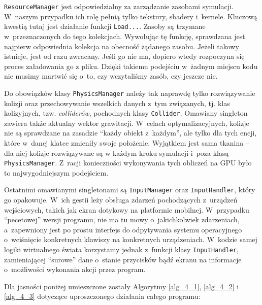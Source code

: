 	\texttt{ResourceManager} jest odpowiedzialny za zarządzanie zasobami symulacji. W~naszym przypadku ich rolę pełnią tylko tekstury, shadery i~kernele. Kluczową kwestią tutaj jest działanie funkcji \texttt{Load...}. Zasoby są trzymane w~przeznaczonych do tego kolekcjach. Wywołując tę funkcję, sprawdzana jest najpierw odpowiednia kolekcja na obecność żądanego zasobu. Jeżeli takowy istnieje, jest od razu zwracany. Jeśli go nie ma, dopiero wtedy rozpoczyna się proces załadowania go z pliku. Dzięki takiemu podejściu w~żadnym miejscu kodu nie musimy martwić się o~to, czy wczytaliśmy zasób, czy jeszcze nie.
	
	Do obowiązków klasy \texttt{PhysicsManager} należy tak naprawdę tylko rozwiązywanie kolizji oraz przechowywanie wszelkich danych z~tym związanych, tj. klas kolizyjnych, tzw. \emph{colliderów}, pochodnych klasy \texttt{Collider}. Omawiany singleton zawiera także aktualny wektor grawitacji. W~celach optymalizacyjnych, kolizje nie są sprawdzane na zasadzie ``każdy obiekt z~każdym'', ale tylko dla tych encji, które w~danej klatce zmieniły swoje położenie. Wyjątkiem jest sama tkanina -- dla niej kolizje rozwiązywane są w każdym kroku symulacji i~poza klasą \texttt{PhysicsManager}. Z~racji konieczności wykonywania tych obliczeń na GPU było to najwygodniejszym podejściem.
	
	Ostatnimi omawianymi singletonami są \texttt{InputManager} oraz \texttt{InputHandler}, który go opakowuje. W~ich gestii leży obsługa zdarzeń pochodzących z~urządzeń wejściowych, takich jak ekran dotykowy na platformie mobilnej. W~przypadku ``pecetowej'' wersji programu, nie ma tu mowy o~jakichkolwiek zdarzeniach, a~zapewniony jest po prostu interfejs do odpytywania systemu operacyjnego o~wciśnięcie konkretnych klawiszy na konkretnych urządzeniach. W~kodzie samej logiki wirtualnego świata korzystamy jednak z~funkcji klasy \texttt{InputHandler}, zamieniającej ``surowe'' dane o~stanie przycisków bądź ekranu na informacje o~możliwości wykonania akcji przez program.
	
	Dla jasności poniżej umieszczone zostały Algorytmy \ref{alg_4_1}, \ref{alg_4_2} i \ref{alg_4_3} dotyczące uproszczonego działania całego programu:
	
